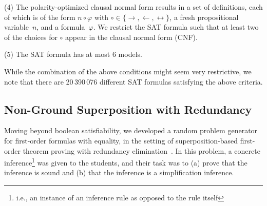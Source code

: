 \noindent(4)
        The polarity-optimized clausal normal form results in a set of definitions,
        each of which is of the form
        $n \circ \varphi$ with $\circ \in \{ \rightarrow, \leftarrow, \leftrightarrow \}$,
        a fresh propositional variable~$n$, and a formula~$\varphi$.
        We restrict the SAT formula such that at least two of the choices for
        $\circ$ appear in the clausal normal form (CNF). \smallskip

\noindent(5)
        The SAT formula has at most $6$ models.
        \smallskip


While the combination of the above conditions might seem very restrictive,
we note that 
there are 20\,390\,076 different SAT formulas satisfying the above
criteria.





\subsection{Non-Ground Superposition with Redundancy}\label{sec:fo}

Moving beyond boolean satisfiability, we developed a random problem
generator for first-order formulas with equality, in the setting of
superposition-based first-order theorem proving with redundancy elimination~\cite{Rubio01,Vampire13}.
In this problem, a concrete inference\footnote{i.e., an instance of an inference rule as opposed to the rule itself}
was given to the students, and their task was to
(a) prove that the inference is sound
and (b) that the inference is a simplification inference.

